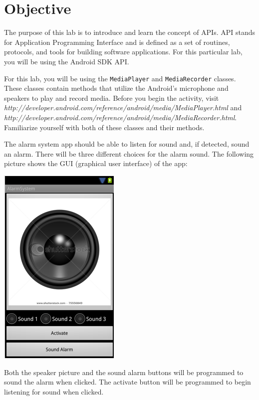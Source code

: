 \section{Objective}

The purpose of this lab is to introduce and learn the concept of APIs. API stands for Application Programming Interface and is defined as a set of routines, protocols, and tools for building software applications. For this particular lab, you will be using the Android SDK API.

For this lab, you will be using the \verb=MediaPlayer= and \verb=MediaRecorder= classes. These classes contain methods that utilize the Android's microphone and speakers to play and record media. Before you begin the activity, visit \textit{http://developer.android.com/reference/android/media/MediaPlayer.html} and \textit{http://developer.android.com/reference/android/media/MediaRecorder.html}. Familiarize yourself with both of these classes and their methods.

The alarm system app should be able to listen for sound and, if detected, sound an alarm. There will be three different choices for the alarm sound. The following picture shows the GUI (graphical user interface) of the app:

\begin{center}

\includegraphics[scale=0.4]{screenshot.png} 

\end{center}

Both the speaker picture and the sound alarm buttons will be programmed to sound the alarm when clicked. The activate button will be programmed to begin listening for sound when clicked.
